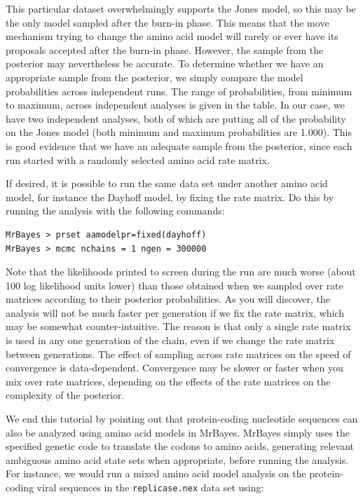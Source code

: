 \documentclass[12pt]{book}
\newcommand{\ttt}[1]{\texttt{#1} }
\begin{document}
This particular dataset overwhelmingly supports the Jones model, so this may be the only model sampled
after the burn-in phase. This means that the move mechanism trying to change the
amino acid model will rarely or ever have its proposals accepted after the burn-in phase. However, the
sample from the posterior may nevertheless be accurate. To determine whether we have an appropriate sample
from the posterior, we simply compare the model probabilities across independent runs. The range of probabilities,
from minimum to maximum, across independent
analyses is given in the table. In our case, we have two independent analyses, both of which are putting all of the
probability on the Jones model (both minimum and maximum probabilities are 1.000). This is good evidence that
we have an adequate sample from the posterior, since each run started with a randomly selected amino acid
rate matrix.

If desired, it is possible to run the same data set under another amino acid model, for instance the Dayhoff
model, by fixing the rate matrix. Do this by running the analysis with the following commands:

\begin{singlespacing}
\begin{verbatim}
MrBayes > prset aamodelpr=fixed(dayhoff)
MrBayes > mcmc nchains = 1 ngen = 300000
\end{verbatim}
\end{singlespacing}

Note that the likelihoods printed to screen during the run are much worse (about 100 log likelihood units lower)
than those obtained when we sampled over rate matrices according to their posterior probabilities.
As you will discover, the analysis will not be much faster per generation if we fix the rate matrix, which may be
somewhat counter-intuitive. The reason is that only a single rate matrix is used in any one generation of the
chain, even if we change the rate matrix between generations. The effect of sampling across
rate matrices on the speed of convergence is data-dependent. Convergence may be slower or faster when
you mix over rate matrices, depending on the effects of the rate matrices on the complexity of the posterior.

We end this tutorial by pointing out that protein-coding nucleotide sequences can also be analyzed using
amino acid models in MrBayes. MrBayes simply uses the specified genetic code to translate the codons to amino acids,
generating relevant ambiguous amino acid state sets when appropriate, before running the analysis. For instance,
we would run a mixed amino acid model analysis on the protein-coding viral sequences in the \ttt{replicase.nex}
data set using:
\end{document}
